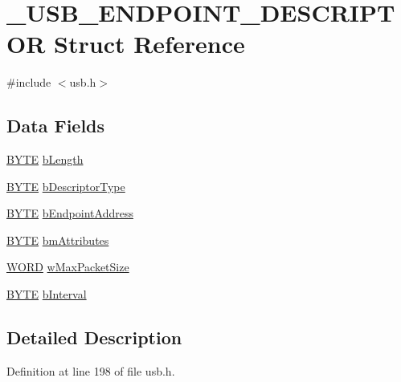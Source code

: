 \hypertarget{struct___u_s_b___e_n_d_p_o_i_n_t___d_e_s_c_r_i_p_t_o_r}{
\section{\_\-USB\_\-ENDPOINT\_\-DESCRIPTOR Struct Reference}
\label{struct___u_s_b___e_n_d_p_o_i_n_t___d_e_s_c_r_i_p_t_o_r}
}


{\ttfamily \#include $<$usb.h$>$}

\subsection*{Data Fields}
\begin{DoxyCompactItemize}
\item 
\hyperlink{type_8h_a4ae1dab0fb4b072a66584546209e7d58}{BYTE} \hyperlink{struct___u_s_b___e_n_d_p_o_i_n_t___d_e_s_c_r_i_p_t_o_r_a8e443464272fdf3bd5148df0b7f5dcaf}{bLength}
\item 
\hyperlink{type_8h_a4ae1dab0fb4b072a66584546209e7d58}{BYTE} \hyperlink{struct___u_s_b___e_n_d_p_o_i_n_t___d_e_s_c_r_i_p_t_o_r_ac1d02ce6fe165032044fb81602a9b07c}{bDescriptorType}
\item 
\hyperlink{type_8h_a4ae1dab0fb4b072a66584546209e7d58}{BYTE} \hyperlink{struct___u_s_b___e_n_d_p_o_i_n_t___d_e_s_c_r_i_p_t_o_r_a80a1ec4bf8007a3ee5ff04c08d6f985d}{bEndpointAddress}
\item 
\hyperlink{type_8h_a4ae1dab0fb4b072a66584546209e7d58}{BYTE} \hyperlink{struct___u_s_b___e_n_d_p_o_i_n_t___d_e_s_c_r_i_p_t_o_r_a5ca38633eddd8c1c055694e5c2c5e566}{bmAttributes}
\item 
\hyperlink{type_8h_a197942eefa7db30960ae396d68339b97}{WORD} \hyperlink{struct___u_s_b___e_n_d_p_o_i_n_t___d_e_s_c_r_i_p_t_o_r_a77f1aab9a5262fe467eb67358cc171fc}{wMaxPacketSize}
\item 
\hyperlink{type_8h_a4ae1dab0fb4b072a66584546209e7d58}{BYTE} \hyperlink{struct___u_s_b___e_n_d_p_o_i_n_t___d_e_s_c_r_i_p_t_o_r_aee006978adb8e78b3536bc7f5ef79e11}{bInterval}
\end{DoxyCompactItemize}


\subsection{Detailed Description}


Definition at line 198 of file usb.h.



